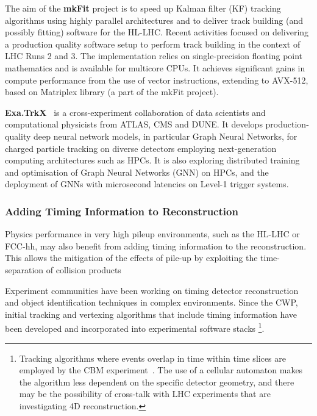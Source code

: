 The aim of the \textbf{mkFit} \cite{cerati2019speeding} project is to speed up Kalman filter (KF)
tracking algorithms using highly parallel architectures and to deliver
track building (and possibly fitting) software for the HL-LHC. Recent
activities focused on delivering a production quality software setup to
perform track building in the context of LHC Runs 2 and 3. The
implementation relies on single-precision floating point mathematics and is
available for multicore CPUs. It achieves significant gains in compute
performance from the use of vector instructions, extending to
AVX-512, based on Matriplex library (a part of the mkFit project).

\textbf{Exa.TrkX}~\cite{Ju:2020xty} is a cross-experiment collaboration of data scientists
and computational physicists from ATLAS, CMS and DUNE. It develops
production-quality deep neural network models, in particular Graph
Neural Networks, for charged particle tracking on diverse detectors
employing next-generation computing architectures such as HPCs. It is
also exploring distributed training and optimisation of Graph Neural
Networks (GNN) on HPCs, and the deployment of GNNs with microsecond
latencies on Level-1 trigger systems.

\hypertarget{addition-of-timing-information-in-reconstruction}{%
\subsubsection{Adding Timing Information to
Reconstruction}\label{addition-of-timing-information-in-reconstruction}}

Physics performance in very high pileup environments, such as the HL-LHC
or FCC-hh, may also benefit from adding timing information to the
reconstruction. This allows the mitigation of the effects of pile-up by
exploiting the time-separation of collision products~\cite{Collaboration:2623663,CMS:2667167}

Experiment communities have been working on timing detector
reconstruction and object identification techniques in complex
environments. Since the CWP, initial tracking and vertexing algorithms
that include timing information have been developed and incorporated
into experimental software stacks \cite{LindseyGreyMIPCTD}\footnote{Tracking algorithms where events overlap in time
within time slices are employed by the CBM experiment~\cite{Akishina:2015ghv,AkishinaThesis}. The use of a cellular automaton makes the
  algorithm less dependent on the specific detector geometry, and there
  may be the possibility of cross-talk with LHC experiments that are
  investigating 4D reconstruction.}.

